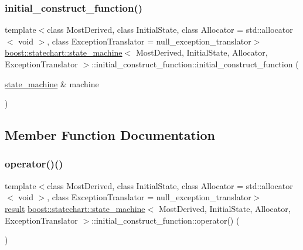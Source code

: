 \subsubsection{\texorpdfstring{initial\+\_\+construct\+\_\+function()}{initial\_construct\_function()}}
{\footnotesize\ttfamily template$<$class Most\+Derived, class Initial\+State, class Allocator = std\+::allocator$<$ void $>$, class Exception\+Translator = null\+\_\+exception\+\_\+translator$>$ \\
\mbox{\hyperlink{classboost_1_1statechart_1_1state__machine}{boost\+::statechart\+::state\+\_\+machine}}$<$ Most\+Derived, Initial\+State, Allocator, Exception\+Translator $>$\+::initial\+\_\+construct\+\_\+function\+::initial\+\_\+construct\+\_\+function (\begin{DoxyParamCaption}\item[{\mbox{\hyperlink{classboost_1_1statechart_1_1state__machine}{state\+\_\+machine}} \&}]{machine }\end{DoxyParamCaption})\hspace{0.3cm}{\ttfamily [inline]}}



\subsection{Member Function Documentation}
\mbox{\label{classboost_1_1statechart_1_1state__machine_1_1initial__construct__function_a01c69aaf3bd43d6b71a088781b8ee27e}} 
\subsubsection{\texorpdfstring{operator()()}{operator()()}}
{\footnotesize\ttfamily template$<$class Most\+Derived, class Initial\+State, class Allocator = std\+::allocator$<$ void $>$, class Exception\+Translator = null\+\_\+exception\+\_\+translator$>$ \\
\mbox{\hyperlink{namespaceboost_1_1statechart_abe807f6598b614d6d87bb951ecd92331}{result}} \mbox{\hyperlink{classboost_1_1statechart_1_1state__machine}{boost\+::statechart\+::state\+\_\+machine}}$<$ Most\+Derived, Initial\+State, Allocator, Exception\+Translator $>$\+::initial\+\_\+construct\+\_\+function\+::operator() (\begin{DoxyParamCaption}{ }\end{DoxyParamCaption})\hspace{0.3cm}{\ttfamily [inline]}}

